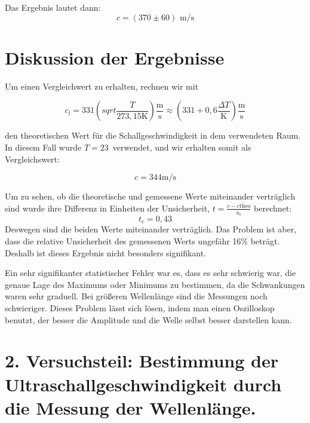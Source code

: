 \documentclass[11pt,a4paper]{article}
\begin{document}
Das Ergebnis lautet dann:
$$ c= (370 \pm 60) \textrm{ m/s}$$








\section{Diskussion der Ergebnisse}

Um einen Vergleichwert zu erhalten, rechnen wir mit

\[
c_l=331\left(sqrt{\frac{T}{273,15\mathrm{K}}}\right)\frac{\mathrm{m}}{\mathrm{s}}\approx\left(331+0,6\frac{\Delta T}{\mathrm{K}}\right)\mathrm{\frac{m}{s}}
\]

den theoretischen Wert f\"ur die Schallgeschwindigkeit in dem verwendeten Raum. In diesem Fall wurde $T=23$\celsius\ verwendet, und wir erhalten somit als Vergleichswert:

\[
c = 344 \textrm{m/s}
\]

Um zu sehen, ob die theoretische und gemessene Werte miteinander verträglich sind wurde ihre Differenz in Einheiten der Unsicherheit, $t = \frac{c-c\textrm{theo}}{u_c}$ berechnet: 
$$t_c = 0,43$$
Deswegen sind die beiden Werte miteinander verträglich. Das Problem ist aber, dass die relative Unsicherheit des gemessenen Werts ungefähr 16\% beträgt. Deshalb ist dieses Ergebnis nicht besonders signifikant.

Ein sehr signifikanter statistischer Fehler war es, dass es sehr schwierig war, die genaue Lage des Maximums oder Minimums zu bestimmen, da die Schwankungen waren sehr graduell. Bei größeren Wellenlänge sind die Messungen noch schwieriger. Dieses Problem lässt sich lösen, indem man einen Oszilloskop benutzt, der besser die Amplitude und die Welle selbst besser darstellen kann. 



\pagebreak

\section{2. Versuchsteil: Bestimmung der Ultraschallgeschwindigkeit durch die Messung der Wellenlänge.}
\end{document}
